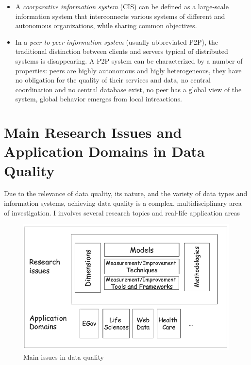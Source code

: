 \begin{itemize}
    \item{A \textit{coorparative information system} (CIS) can be defined as a large-scale information system that interconnects various systems of different and autonomous organizations, 
    while sharing common objectives.}
    \item{In a \textit{peer to peer information system} (usually abbreviated P2P), the traditional distinction between clients and servers typical of distributed systems is disappearing.
    A P2P system can be characterized by a number of properties: peers are highly autonomous and higly heterogeneous, they have no obligation for the quality of their services
    and data, no central coordination and no central database exist, no peer has a global view of the system, global behavior emerges from local intreactions.    
    }
\end{itemize}


\section{Main Research Issues and Application Domains in Data Quality}
Due to the relevance of data quality, its nature, and the variety of data types and information systems, achieving data quality is a complex, multidisciplinary 
area of investigation. I involves several research topics and real-life application areas

\begin{figure}[h]
\vspace*{.0in}
\centering
\includegraphics[scale=.50]{main-issues-in-dq}
\caption{Main issues in data quality}    
\end{figure}